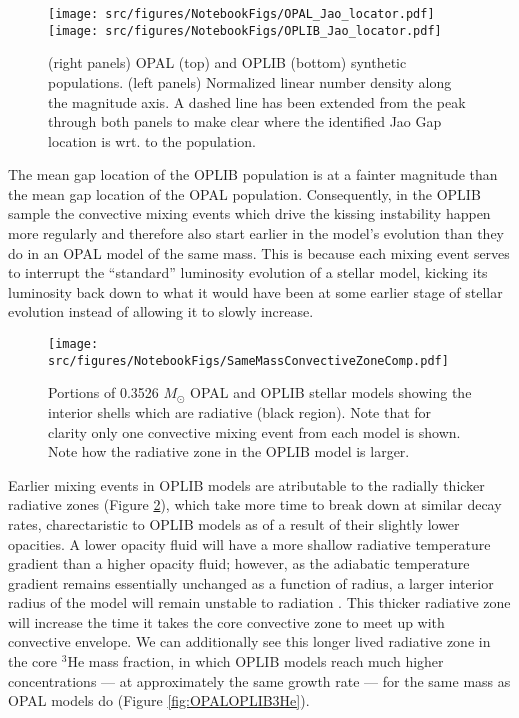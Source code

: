 \begin{figure}
	\centering
	\texttt{[image: src/figures/NotebookFigs/OPAL\_Jao\_locator.pdf]}
	\texttt{[image: src/figures/NotebookFigs/OPLIB\_Jao\_locator.pdf]}
	\caption{(right panels) OPAL (top) and OPLIB (bottom) synthetic
	populations. (left panels) Normalized linear number density along the
	magnitude axis. A dashed line has been extended from the peak through both
	panels to make clear where the identified Jao Gap location is wrt. to the
	population. }
	\label{fig:JaoGapLocator}
\end{figure}

The mean gap location of the OPLIB population is at a fainter magnitude than
the mean gap location of the OPAL population. Consequently, in the OPLIB sample
the convective mixing events which drive the kissing instability happen more
regularly and therefore also start earlier in the model's evolution than they
do in an OPAL model of the same mass. This is because each mixing event serves
to interrupt the ``standard'' luminosity evolution of a stellar model, kicking
its luminosity back down to what it would have been at some earlier stage of
stellar evolution instead of allowing it to slowly increase.

\begin{figure}
	\centering
	\texttt{[image: src/figures/NotebookFigs/SameMassConvectiveZoneComp.pdf]}
	\caption{Portions of 0.3526 $M_{\odot}$ OPAL and OPLIB stellar models
	showing the interior shells which are radiative (black region). Note that
	for clarity only one convective mixing event from each model is shown. Note
	how the radiative zone in the OPLIB model is larger.}
	\label{fig:Unstable}
\end{figure}

Earlier mixing events in OPLIB models are atributable to the radially thicker
radiative zones (Figure \ref{fig:Unstable}), which take more time to break down
at similar decay rates, charectaristic to OPLIB models as of a result of their
slightly lower opacities. A lower opacity fluid will have a more shallow
radiative temperature gradient than a higher opacity fluid; however, as the
adiabatic temperature gradient remains essentially unchanged as a function of
radius, a larger interior radius of the model will remain unstable to radiation
. This thicker radiative zone will increase the time it takes the core
convective zone to meet up with convective envelope. We can additionally see
this longer lived radiative zone in the core $^{3}$He mass fraction, in which
OPLIB models reach much higher concentrations --- at approximately the same
growth rate --- for the same mass as OPAL models do (Figure
\ref{fig:OPALOPLIB3He}). 

